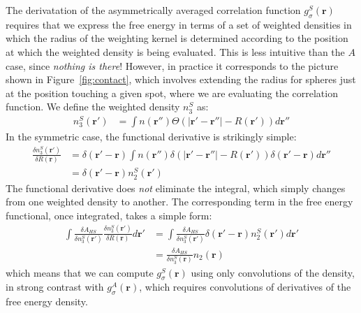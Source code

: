 \documentclass[letterpaper,twocolumn,amsmath,amssymb,jcp,10pt,aip]{revtex4-1}
\newcommand{\rr}{\textbf{r}}
\begin{document}
\begin{widetext}
The derivatation of the asymmetrically averaged correlation function
$g_\sigma^S(\rr)$ requires that we express the free energy in terms of
a set of weighted densities in which the radius of the weighting
kernel is determined according to the position at which the weighted
density is being evaluated.  This is less intuitive than the $A$ case,
since \emph{nothing is there}!  However, in practice it corresponds to
the picture shown in Figure~\ref{fig:contact}, which involves
extending the radius for spheres just at the position touching a
given spot, where we are evaluating the correlation function.  We
define the weighted density $n_3^S$ as:
\begin{align}
  n_3^{S}(\rr') &= \int n(\rr'') \Theta(\left|\rr' - \rr''\right| -R(\rr')) d\rr''
\end{align}
In the symmetric case, the functional derivative is strikingly simple:
\begin{align}
  \frac{\delta n_3^{S} (\rr')}{\delta R(\rr)} &=
   \delta(\rr'-\rr) \int n (\rr'') \delta(|\rr' - \rr''| - R(\rr'))
   \delta(\rr'-\rr) d\rr''
   \\
   &= \delta(\rr'-\rr) n_2^S(\rr')
\end{align}
The functional derivative does \emph{not} eliminate the integral,
which simply changes from one weighted density to another.  The
corresponding term in the free energy functional, once integrated,
takes a simple form:
\begin{align}
  \int \frac{\delta A_{HS}}{\delta n_3^{S}(\rr')}
  \frac{\delta n_3^{S}(\rr')}{\delta R(\rr)} d\rr'
  &= \int \frac{\delta A_{HS}}{\delta n_3^{S}(\rr')} \delta(\rr'-\rr)
  n_2^S(\rr') d\rr' \\
  &= \frac{\delta A_{HS}}{\delta n_3^{S}(\rr)} n_2(\rr)
\end{align}
which means that we can compute $g_\sigma^S(\rr)$ using only
convolutions of the density, in strong contrast with
$g_\sigma^A(\rr)$, which requires convolutions of derivatives of the
free energy density.


\end{widetext}
\end{document}
